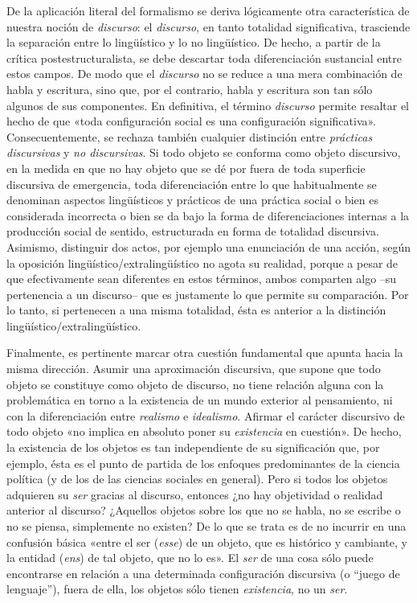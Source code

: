 De la aplicación literal del formalismo se deriva lógicamente otra característica de nuestra noción de \emph{discurso}: el \emph{discurso}, en tanto totalidad significativa, trasciende la separación entre lo lingüístico y lo no lingüístico. De hecho, a partir de la crítica postestructuralista, se debe descartar toda diferenciación sustancial entre estos campos. De modo que el \emph{discurso} no se reduce a una mera combinación de habla y escritura, sino que, por el contrario, habla y escritura son tan sólo algunos de sus componentes. En definitiva, el término \emph{discurso }permite resaltar el hecho de que «toda configuración social es una configuración significativa». Consecuentemente, se rechaza también cualquier distinción entre \emph{prácticas discursivas} y \emph{no discursivas}. Si todo objeto se conforma como objeto discursivo, en la medida en que no hay objeto que se dé por fuera de toda superficie discursiva de emergencia, toda diferenciación entre lo que habitualmente se denominan aspectos lingüísticos y prácticos de una práctica social o bien es considerada incorrecta o bien se da bajo la forma de diferenciaciones internas a la producción social de sentido, estructurada en forma de totalidad discursiva. Asimismo, distinguir dos actos, por ejemplo una enunciación de una acción, según la oposición lingüístico/extralingüístico no agota su realidad, porque a pesar de que efectivamente sean diferentes en estos términos, ambos comparten algo --su pertenencia a un discurso-- que es justamente lo que permite su comparación. Por lo tanto, si pertenecen a una misma totalidad, ésta es anterior a la distinción lingüístico/extralingüístico.

Finalmente, es pertinente marcar otra cuestión fundamental que apunta hacia la misma dirección. Asumir una aproximación discursiva, que supone que todo objeto se constituye como objeto de discurso, no tiene relación alguna con la problemática en torno a la existencia de un mundo exterior al pensamiento, ni con la diferenciación entre \emph{realismo} e \emph{idealismo}. Afirmar el carácter discursivo de todo objeto «no implica en absoluto poner su \emph{existencia} en cuestión». De hecho, la existencia de los objetos es tan independiente de su significación que, por ejemplo, ésta es el punto de partida de los enfoques predominantes de la ciencia política (y de los de las ciencias sociales en general). Pero si todos los objetos adquieren su \emph{ser} gracias al discurso, entonces ¿no hay objetividad o realidad anterior al discurso? ¿Aquellos objetos sobre los que no se habla, no se escribe o no se piensa, simplemente no existen? De lo que se trata es de no incurrir en una confusión básica «entre el ser (\emph{esse}) de un objeto, que es histórico y cambiante, y la entidad (\emph{ens}) de tal objeto, que no lo es». El \emph{ser} de una cosa sólo puede encontrarse en relación a una determinada configuración discursiva (o ``juego de lenguaje''), fuera de ella, los objetos sólo tienen \emph{existencia}, no un \emph{ser}.

